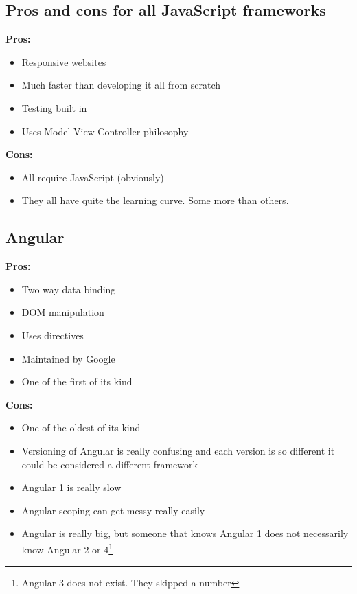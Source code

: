 \documentclass[draftclsnofoot,onecolumn,letterpaper,10pt,compsoc]{IEEEtran}
\begin{document}
  \subsection{Pros and cons for all JavaScript frameworks}
    \textbf{Pros:}
    \begin{itemize}
      \item Responsive websites
      \item Much faster than developing it all from scratch
      \item Testing built in
      \item Uses Model-View-Controller philosophy
    \end{itemize}

    \textbf{Cons:}
    \begin{itemize}
      \item All require JavaScript (obviously)
      \item They all have quite the learning curve. Some more than others.
    \end{itemize}

	\subsection{Angular}

  \textbf{Pros:}
    \begin{itemize}
      \item Two way data binding
      \item DOM manipulation
      \item Uses directives
      \item Maintained by Google
      \item One of the first of its kind
    \end{itemize}

    \textbf{Cons:}
    \begin{itemize}
      \item One of the oldest of its kind
      \item Versioning of Angular is really confusing and each version is so different it could be considered a different framework
      \item Angular 1 is really slow
      \item Angular scoping can get messy really easily
      \item Angular is really big, but someone that knows Angular 1 does not necessarily know Angular 2 or 4\footnote{Angular 3 does not exist. They skipped a number}
    \end{itemize}
\end{document}
